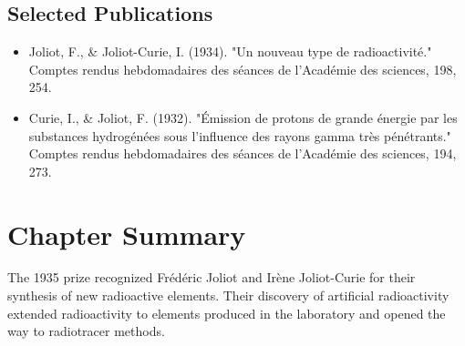 \subsection*{Selected Publications}

\begin{itemize}

\item Joliot, F., \& Joliot-Curie, I. (1934). "Un nouveau type de radioactivité." Comptes rendus hebdomadaires des séances de l'Académie des sciences, 198, 254.

\item Curie, I., \& Joliot, F. (1932). "Émission de protons de grande énergie par les substances hydrogénées sous l'influence des rayons gamma très pénétrants." Comptes rendus hebdomadaires des séances de l'Académie des sciences, 194, 273.

\end{itemize}

\clearpage

\section*{Chapter Summary}

The 1935 prize recognized Frédéric Joliot and Irène Joliot-Curie for their synthesis of new radioactive elements. Their discovery of artificial radioactivity extended radioactivity to elements produced in the laboratory and opened the way to radiotracer methods.
